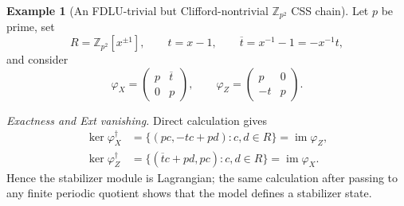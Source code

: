\documentclass[aps,prx,english,superscriptaddress,twocolumn,tightenlines,showpacs,longbibliography,floatfix,amsfonts]{revtex4-2}
\theoremstyle{remark}
\theoremstyle{definition}
\newtheorem{example}{Example}
\begin{document}
\begin{example}[An FDLU-trivial but Clifford-nontrivial \(\mathbb Z_{p^2}\) CSS chain]
	\label{prop:minimal-filtered-cluster}
	Let $p$ be prime, set
	\begin{equation}
		R=\mathbb Z_{p^2}[x^{\pm1}],
		\qquad
		t=x-1,
		\qquad
		\overline{t}=x^{-1}-1=-x^{-1}t,
	\end{equation}
	and consider
	\begin{equation}
		\varphi_X=
		\begin{pmatrix}
			p & \overline{t}\\
			0 & p
		\end{pmatrix},
		\qquad
		\varphi_Z=
		\begin{pmatrix}
			p & 0\\
			-t & p
		\end{pmatrix}.
	\end{equation}

	\emph{Exactness and Ext vanishing.}
	Direct calculation gives
	\begin{align}
		\ker\varphi_X^\dagger
		&=
		\bigl\{(pc,-tc+pd):c,d\in R\bigr\}
		=
		\operatorname{im}\varphi_Z,\\
		\ker\varphi_Z^\dagger
		&=
		\bigl\{(\overline{t}c+pd,pc):c,d\in R\bigr\}
		=
		\operatorname{im}\varphi_X.
	\end{align}
	Hence the stabilizer module is Lagrangian; the same calculation after
	passing to any finite periodic quotient shows that the model defines a
	stabilizer state.


\end{example}
\end{document}
